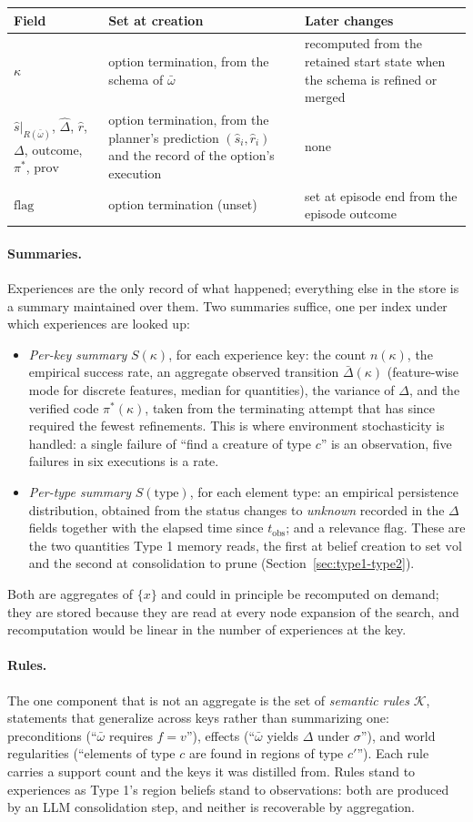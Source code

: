 \documentclass[11pt]{article}
\makeatletter
\newcommand{\calK}{\mathcal{K}}
\newcommand{\Rel}{R}
\newcommand{\shat}{\hat{s}}
\newcommand{\prov}{\mathrm{prov}}
\newcommand{\vol}{\mathrm{vol}}
\newcommand{\type}{\mathrm{type}}
\newcommand{\tobs}{t_{\mathrm{obs}}}
\newenvironment{lifecycle}{\begin{center}\small\begin{tabular}{@{}>{\raggedright\arraybackslash}p{0.17\textwidth}>{\raggedright\arraybackslash}p{0.36\textwidth}>{\raggedright\arraybackslash}p{0.40\textwidth}@{}}\toprule Field & Set at creation & Later changes \\ \midrule}{\bottomrule\end{tabular}\end{center}}
\makeatother
\begin{document}
\begin{lifecycle}
$\kappa$ & option termination, from the schema of $\bar\omega$ & recomputed from the retained start state when the schema is refined or merged \\
$\shat|_{\Rel(\bar\omega)}$, $\hat\Delta$, $\hat r$, $\Delta$, $\mathrm{outcome}$, $\pi^\ast$, $\prov$ & option termination, from the planner's prediction $(\shat_i,\hat r_i)$ and the record of the option's execution & none \\
$\mathrm{flag}$ & option termination (unset) & set at episode end from the episode outcome \\
\end{lifecycle}

\paragraph{Summaries.}
Experiences are the only record of what happened; everything else in the store is a summary maintained over them. Two summaries suffice, one per index under which experiences are looked up:
\begin{itemize}[leftmargin=1.5em,itemsep=1pt]
\item \emph{Per-key summary} $S(\kappa)$, for each experience key: the count $n(\kappa)$, the empirical success rate, an aggregate observed transition $\bar\Delta(\kappa)$ (feature-wise mode for discrete features, median for quantities), the variance of $\Delta$, and the verified code $\pi^\ast(\kappa)$, taken from the terminating attempt that has since required the fewest refinements. This is where environment stochasticity is handled: a single failure of ``find a creature of type $c$'' is an observation, five failures in six executions is a rate.
\item \emph{Per-type summary} $S(\type)$, for each element type: an empirical persistence distribution, obtained from the status changes to \emph{unknown} recorded in the $\Delta$ fields together with the elapsed time since $\tobs$; and a relevance flag. These are the two quantities Type 1 memory reads, the first at belief creation to set $\vol$ and the second at consolidation to prune (Section~\ref{sec:type1-type2}).
\end{itemize}
Both are aggregates of $\{x\}$ and could in principle be recomputed on demand; they are stored because they are read at every node expansion of the search, and recomputation would be linear in the number of experiences at the key.

\paragraph{Rules.}
The one component that is not an aggregate is the set of \emph{semantic rules} $\calK$, statements that generalize across keys rather than summarizing one: preconditions (``$\bar\omega$ requires $f=v$''), effects (``$\bar\omega$ yields $\Delta$ under $\sigma$''), and world regularities (``elements of type $c$ are found in regions of type $c'$''). Each rule carries a support count and the keys it was distilled from. Rules stand to experiences as Type 1's region beliefs stand to observations: both are produced by an LLM consolidation step, and neither is recoverable by aggregation.
\end{document}
